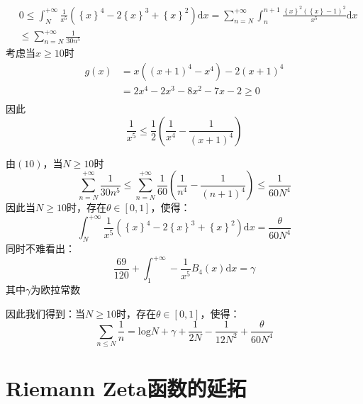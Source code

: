 \documentclass[a4paper,12pt]{ctexart}
\newenvironment{prooff}{{\noindent\it\textcolor{black}{Proof}:}\quad}{\par}
\newcommand{\bbrace}[1]{\left\{ #1 \right\} }
\theoremstyle{definition}
\begin{document}
\begin{prooff}
    \begin{align*}
         & 0\le \int_N^{+\infty}\frac{1}{x^5}(\bbrace{x}^4-2\bbrace{x}^3+\bbrace{x}^2)\text{d}x=\sum_{n=N}^{+\infty}\int_n^{n+1}\frac{\bbrace{x}^2(\bbrace{x}-1)^2}{x^5}\text{d}x \\
         & \le \sum_{n=N}^{+\infty}\frac{1}{30n^5}
    \end{align*}
    考虑当$x\ge 10$时
    \begin{align*}
        g(x) & = x((x+1)^4-x^4)-2(x+1)^4   \\
             & = 2x^4-2x^3-8x^2-7x-2 \ge 0 \\
    \end{align*}
    因此
    \begin{equation}
        \frac{1}{x^5}\le \frac{1}{2}(\frac{1}{x^4}-\frac{1}{(x+1)^4})
    \end{equation}

    由$(10)$，当$N\ge 10$时
    \begin{equation}
        \sum_{n=N}^{+\infty}\frac{1}{30n^5}\le \sum_{n=N}^{+\infty}\frac{1}{60}(\frac{1}{n^4}-\frac{1}{(n+1)^4})\le \frac{1}{60N^4}
    \end{equation}
    因此当$N\ge10$时，存在$\theta \in [0,1]$，使得：
    \begin{equation*}
        \int_N^{+\infty}\frac{1}{x^5}(\bbrace{x}^4-2\bbrace{x}^3+\bbrace{x}^2)\text{d}x=\frac{\theta}{60N^4}
    \end{equation*}
    同时不难看出：
    \begin{equation*}
        \frac{69}{120}+\int_1^{+\infty}-\frac{1}{x^5}B_4(x)\text{d}x=\gamma
    \end{equation*}
    其中$\gamma$为欧拉常数

    因此我们得到：当$N\ge10$时，存在$\theta \in [0,1]$，使得：
    \begin{equation}
        \sum_{n\le N}\frac{1}{n}=\text{log}N+\gamma+\frac{1}{2N}-\frac{1}{12N^2}+\frac{\theta}{60N^4}
    \end{equation}
\end{prooff}
\section{Riemann Zeta函数的延拓}
\end{document}
